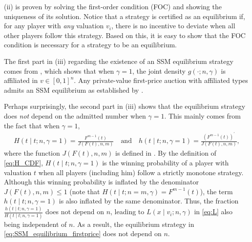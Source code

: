  (ii) is proven by solving the first-order condition (FOC) and showing the uniqueness of its solution. Notice that a strategy is certified as an equilibrium if, for any player with \textit{any} valuation $v_i$, there is no incentive to deviate when all other players follow this strategy. Based on this, it is easy to show that the FOC condition is necessary for a strategy to be an equilibrium.

The first part in  (iii) regarding the existence of an SSM equilibrium strategy comes from , which shows that when $\gamma=1$, the joint density $g(\cdot;n,\gamma)$ is affiliated in $v\in [0,1]^n$. Any private-value first-price auction with affiliated types admits an SSM equilibrium as established by \citet{milgrom_1982_auctiontheory_competitive_bidding}.

Perhaps surprisingly, the second part in  (iii) shows that the equilibrium strategy does \textit{not} depend on the admitted number when $\gamma=1$. This mainly comes from the fact that when $\gamma=1$, 
\begin{align*}
 H(t\mid t;n,\gamma=1) = \frac{F^{m-1}(t)}{J(F(t),n,m)}   \quad
 \textrm{and} \quad
  h(t\mid t;n,\gamma=1) = \frac{(F^{m-1}(t))^\prime}{J(F(t),n,m)},
\end{align*}
where the function $J(F(t),n,m)$ is defined in . By the definition of \eqref{eq:H_CDF}, $H(t\mid t;n,\gamma=1)$ is the winning probability of a player with valuation $t$ when all players (including him) follow a strictly monotone strategy. Although this winning probability is inflated by the denominator $J(F(t),n,m)\leq 1$ (note that $H(t\mid t;n=m,\gamma)=F^{m-1}(t)$), the term $h(t\mid t;n,\gamma=1)$ is also inflated by the same denominator. Thus, the fraction $\frac{h(t\mid t;n,\gamma=1)}{H(t\mid t;n,\gamma=1)}$ does not depend on $n$, leading to $L(x\mid v_i;n,\gamma)$ in \eqref{eq:L} also being independent of $n$.
As a result, the equilibrium strategy in \eqref{eq:SSM_equilibrium_firstprice} does not depend on $n$.



